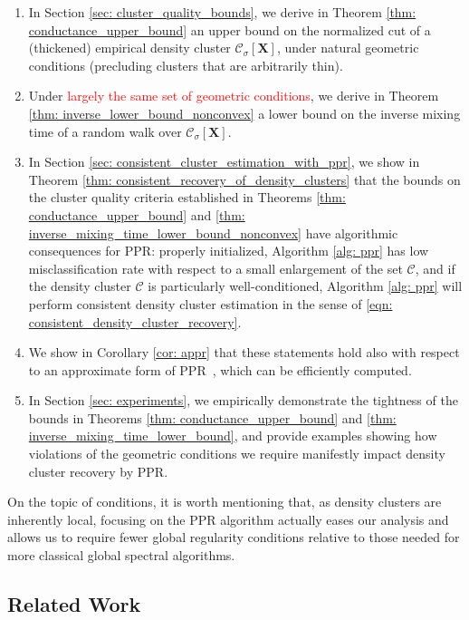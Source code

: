 \documentclass{article}
\newcommand{\1}{\mathbf{1}}
\newcommand{\Xbf}{\mathbf{X}}
\newcommand{\Cset}{\mathcal{C}}
\newcommand{\Csig}{\Cset_{\sigma}}
\newcommand{\ppr}{{\sc PPR}}
\newcommand{\pprspace}{{\sc PPR~}}
\theoremstyle{aldenthm}
\theoremstyle{aldenrmrk}
\begin{document}
\begin{enumerate}
\item In Section \ref{sec: cluster_quality_bounds}, we derive in Theorem
  \ref{thm: conductance_upper_bound} an upper bound on the normalized cut of a  
  (thickened) empirical density cluster $\Csig[\Xbf]$, under natural geometric 
  conditions (precluding clusters that are arbitrarily thin).  

\item Under \textcolor{red}{largely the same set of geometric conditions}, we derive in Theorem
  \ref{thm: inverse_lower_bound_nonconvex} a lower bound on the
  inverse mixing time of a random walk over $\Csig[\Xbf]$.
	
\item In Section \ref{sec: consistent_cluster_estimation_with_ppr}, we show in
  Theorem \ref{thm: consistent_recovery_of_density_clusters} that the bounds on the cluster quality criteria established in Theorems \ref{thm: conductance_upper_bound} and \ref{thm:
    inverse_mixing_time_lower_bound_nonconvex} have algorithmic consequences for \ppr: 
  properly initialized, Algorithm \ref{alg: ppr} has low misclassification rate with respect to a small enlargement of the set $\Cset$, and if the density cluster $\Cset$ is particularly well-conditioned, Algorithm \ref{alg: ppr} will perform consistent density cluster estimation in the sense of \eqref{eqn: consistent_density_cluster_recovery}. 
	
\item We show in Corollary \ref{cor: appr} that these statements hold also with respect to an approximate form of \pprspace, which can be efficiently computed.

\item In Section \ref{sec: experiments}, we empirically
  demonstrate the tightness of the bounds in Theorems \ref{thm: conductance_upper_bound} and \ref{thm: inverse_mixing_time_lower_bound}, and provide examples showing how violations of the geometric conditions we require manifestly
  impact density cluster recovery by \ppr.  
\end{enumerate}

On the topic of conditions, it is worth mentioning that, as density clusters
are inherently local, focusing on the PPR algorithm actually eases our analysis
and allows us to require fewer global regularity conditions relative to those
needed for more classical global spectral algorithms.    

\subsection{Related Work}
\end{document}
